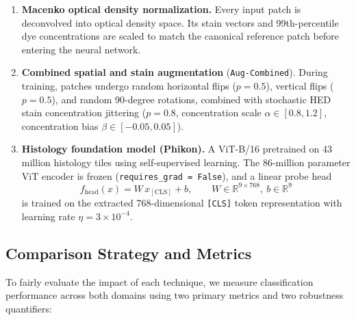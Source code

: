 \documentclass[11pt,a4paper]{article}
\begin{document}
\begin{enumerate}
  \item \textbf{Macenko optical density normalization.} Every input patch is
        deconvolved into optical density space. Its stain vectors and 99th-percentile
        dye concentrations are scaled to match the canonical reference patch before
        entering the neural network.
  \item \textbf{Combined spatial and stain augmentation} (\texttt{Aug-Combined}).
        During training, patches undergo random horizontal flips ($p=0.5$), vertical
        flips ($p=0.5$), and random 90-degree rotations, combined with stochastic HED
        stain concentration jittering ($p=0.8$, concentration scale
        $\alpha \in [0.8, 1.2]$, concentration bias $\beta \in [-0.05, 0.05]$).
  \item \textbf{Histology foundation model (Phikon).} A ViT-B/16 pretrained on 43
        million histology tiles using self-supervised learning. The 86-million
        parameter ViT encoder is frozen (\texttt{requires\_grad = False}), and a
        linear probe head
        \begin{equation}
          f_{\text{head}}(x) = W\,x_{[\text{CLS}]} + b,
          \qquad W \in \mathbb{R}^{9\times768},\ b \in \mathbb{R}^{9}
        \end{equation}
        is trained on the extracted 768-dimensional \texttt{[CLS]} token
        representation with learning rate $\eta = 3\times10^{-4}$.
\end{enumerate}

\subsection{Comparison Strategy and Metrics}
To fairly evaluate the impact of each technique, we measure classification
performance across both domains using two primary metrics and two robustness
quantifiers:
\end{document}
